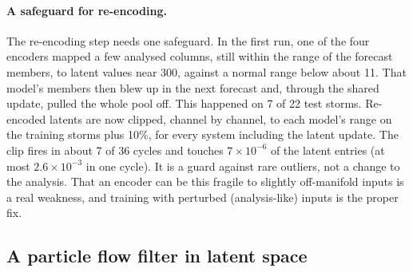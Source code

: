 \documentclass[11pt]{article}
\begin{document}
\paragraph{A safeguard for re-encoding.} The re-encoding step needs one safeguard. In the first run, one of the four encoders mapped a few analysed columns, still within the range of the forecast members, to latent values near 300, against a normal range below about 11. That model's members then blew up in the next forecast and, through the shared update, pulled the whole pool off. This happened on 7 of 22 test storms. Re-encoded latents are now clipped, channel by channel, to each model's range on the training storms plus 10\%, for every system including the latent update. The clip fires in about 7 of 36 cycles and touches $7 \times 10^{-6}$ of the latent entries (at most $2.6 \times 10^{-3}$ in one cycle). It is a guard against rare outliers, not a change to the analysis. That an encoder can be this fragile to slightly off-manifold inputs is a real weakness, and training with perturbed (analysis-like) inputs is the proper fix.

\subsection*{A particle flow filter in latent space}
\end{document}
